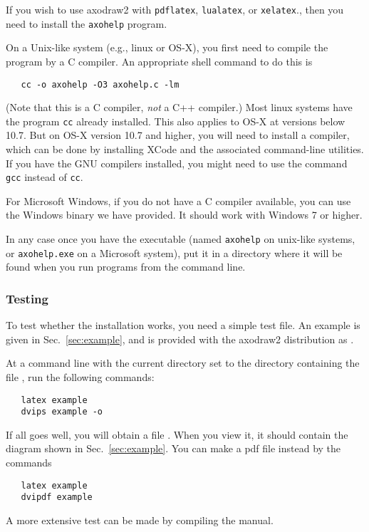 \documentclass[12pt]{article}
\def\program#1{\texttt{#1}}
\begin{document}
If you wish to use axodraw2 with \program{pdflatex}, \program{lualatex},
or \program{xelatex}., then you need to install the \program{axohelp}
program.

On a Unix-like system (e.g., linux or OS-X), you first need to compile
the program by a C compiler.  An appropriate shell command to do this
is
\begin{verbatim}
   cc -o axohelp -O3 axohelp.c -lm
\end{verbatim}
(Note that this is a C compiler, \emph{not} a C++ compiler.)  Most linux
systems have the program \program{cc} already installed.  This also applies to
OS-X at versions below 10.7.  But on OS-X version 10.7 and higher, you
will need to install a compiler, which can be done by installing XCode
and the associated command-line utilities.  If you have the GNU
compilers installed, you might need to use the command \program{gcc}
instead of \program{cc}.

For Microsoft Windows, if you do not have a C compiler available, you
can use the Windows binary  we have provided.  It
should work with Windows 7 or higher.

In any case once you have the executable (named \program{axohelp} on
unix-like systems, or \program{axohelp.exe} on a Microsoft system), put
it in a directory where it will be found when you run programs from
the command line.


\subsubsection{Testing}

To test whether the installation works, you need a simple test file.
An example is given in Sec.\ \ref{sec:example}, and is provided
with the axodraw2 distribution as .

At a command line with the current directory set to the directory
containing the file , run the following commands:
\begin{verbatim}
   latex example
   dvips example -o
\end{verbatim}
If all goes well, you will obtain a file .  When
you view it, it should contain the diagram shown in Sec.\
\ref{sec:example}.  You can make a pdf file instead by the commands
\begin{verbatim}
   latex example
   dvipdf example
\end{verbatim}
A more extensive test can be made by compiling the manual.
\end{document}
